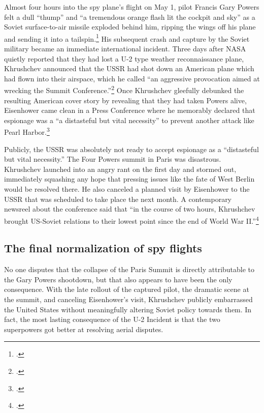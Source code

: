 \documentclass{report}
\begin{document}
\begin{refsegment}
Almost four hours into the spy plane's flight on May 1, pilot Francis Gary Powers felt a dull ``thump'' and ``a tremendous orange flash lit the cockpit and sky'' as a Soviet surface-to-air missile exploded behind him, ripping the wings off his plane and sending it into a tailspin.\footcite[p.~61]{powers_operation_2004} His subsequent crash and capture by the Soviet military became an immediate international incident. Three days after NASA quietly reported that they had lost a U-2 type weather reconnaissance plane, Khrushchev announced that the USSR had shot down an American plane which had flown into their airspace, which he called ``an aggressive provocation aimed at wrecking the Summit Conference.''\footcite[p.~112]{powers_operation_2004} Once Khrushchev gleefully debunked the resulting American cover story by revealing that they had taken Powers alive, Eisenhower came clean in a Press Conference where he memorably declared that espionage was a ``a distasteful but vital necessity'' to prevent another attack like Pearl Harbor.\footcite{eisenhower_news_1960}

Publicly, the USSR was absolutely not ready to accept espionage as a ``distasteful but vital necessity.'' The Four Powers summit in Paris was disastrous. Khrushchev launched into an angry rant on the first day and stormed out, immediately squashing any hope that pressing issues like the fate of West Berlin would be resolved there. He also canceled a planned visit by Eisenhower to the USSR that was scheduled to take place the next month. A contemporary newsreel about the conference said that ``in the course of two hours, Khrushchev brought US-Soviet relations to their lowest point since the end of World War II.''\footcite{universal_studios_summit_1960}

\subsection{The final normalization of spy flights}
No one disputes that the collapse of the Paris Summit is directly attributable to the Gary Powers shootdown, but that also appears to have been the only consequence. With the late rollout of the captured pilot, the dramatic scene at the summit, and canceling Eisenhower's visit, Khrushchev publicly embarrassed the United States without meaningfully altering Soviet policy towards them. In fact, the most lasting consequence of the U-2 Incident is that the two superpowers got better at resolving aerial disputes.


\end{refsegment}
\end{document}

